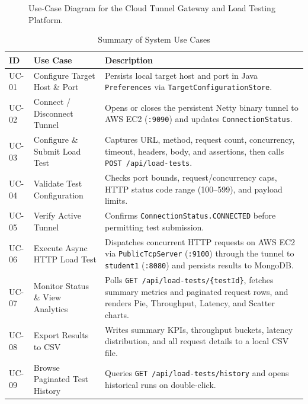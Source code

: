 \documentclass[11pt,a4paper]{report}
\begin{document}
\begin{figure}[!htbp]
{%
}
\caption{Use-Case Diagram for the Cloud Tunnel Gateway and Load Testing Platform.}
\label{fig:usecase}
\end{figure}

\begin{table}[!htbp]
\centering
\small
\caption{Summary of System Use Cases}
\label{tab:usecases}
\begin{tabularx}{\linewidth}{|L{1.2cm}|L{4.0cm}|Y|}
\hline
\textbf{ID} & \textbf{Use Case} & \textbf{Description} \\
\hline
UC-01 & Configure Target Host \& Port & Persists local target host and port in Java \texttt{Preferences} via \texttt{TargetConfigurationStore}. \\
\hline
UC-02 & Connect / Disconnect Tunnel & Opens or closes the persistent Netty binary tunnel to AWS EC2 (\texttt{:9090}) and updates \texttt{ConnectionStatus}. \\
\hline
UC-03 & Configure \& Submit Load Test & Captures URL, method, request count, concurrency, timeout, headers, body, and assertions, then calls \texttt{POST /api/load-tests}. \\
\hline
UC-04 & Validate Test Configuration & Checks port bounds, request/concurrency caps, HTTP status code range (100--599), and payload limits. \\
\hline
UC-05 & Verify Active Tunnel & Confirms \texttt{ConnectionStatus.CONNECTED} before permitting test submission. \\
\hline
UC-06 & Execute Async HTTP Load Test & Dispatches concurrent HTTP requests on AWS EC2 via \texttt{PublicTcpServer} (\texttt{:9100}) through the tunnel to \texttt{student1} (\texttt{:8080}) and persists results to MongoDB. \\
\hline
UC-07 & Monitor Status \& View Analytics & Polls \texttt{GET /api/load-tests/\{testId\}}, fetches summary metrics and paginated request rows, and renders Pie, Throughput, Latency, and Scatter charts. \\
\hline
UC-08 & Export Results to CSV & Writes summary KPIs, throughput buckets, latency distribution, and all request details to a local CSV file. \\
\hline
UC-09 & Browse Paginated Test History & Queries \texttt{GET /api/load-tests/history} and opens historical runs on double-click. \\
\hline
\end{tabularx}
\end{table}
\end{document}
